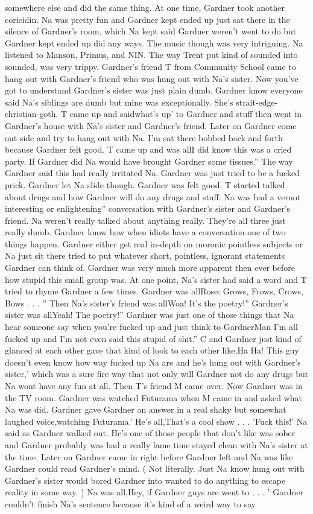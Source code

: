 \documentclass[12pt]{book}
\begin{document}
somewhere else and did the same thing. At one time, Gardner took another coricidin. Na was pretty fun and Gardner kept ended up just sat there in the silence of Gardner's room, which Na kept said Gardner weren't went to do but Gardner kept ended up did any ways. The music though was very intriguing. Na listened to Manson, Primus, and NIN. The way Trent put kind of sounded into sounded, was very trippy. Gardner's friend T from Community School came to hang out with Gardner's friend who was hung out with Na's sister. Now you've got to understand Gardner's sister was just plain dumb. Gardner know everyone said Na's siblings are dumb but mine was exceptionally. She's strait-edge-christian-goth. T came up and saidwhat's up' to Gardner and stuff then went in Gardner's house with Na's sister and Gardner's friend. Later on Gardner come out side and try to hang out with Na. I'm sat there bobbed back and forth because Gardner felt good. T came up and was allI did know this was a cried party. If Gardner did Na would have brought Gardner some tissues.'' The way Gardner said this had really irritated Na. Gardner was just tried to be a fucked prick. Gardner let Na slide though. Gardner was felt good. T started talked about drugs and how Gardner will do any drugs and stuff. Na was had a vernot interesting or enlightening'' conversation with Gardner's sister and Gardner's friend. Na weren't really talked about anything really. They're all three just really dumb. Gardner know how when idiots have a conversation one of two things happen. Gardner either get real in-depth on moronic pointless subjects or Na just sit there tried to put whatever short, pointless, ignorant statements Gardner can think of. Gardner was very much more apparent then ever before how stupid this small group was. At one point, Na's sister had said a word and T tried to rhyme Gardner a few times. Gardner was allRose: Grows, Frows, Crows, Bows . . . '' Then Na's sister's friend was allWoa! It's the poetry!'' Gardner's sister was allYeah! The poetry!'' Gardner was just one of those things that Na hear someone say when you're fucked up and just think to GardnerMan I'm all fucked up and I'm not even said this stupid of shit.'' C and Gardner just kind of glanced at each other gave that kind of look to each other like,Ha Ha! This guy doesn't even know how way fucked up Na are and he's hung out with Gardner's sister,' which was a sure fire way that not only will Gardner not do any drugs but Na wont have any fun at all. Then T's friend M came over. Now Gardner was in the TV room. Gardner was watched Futurama when M came in and asked what Na was did. Gardner gave Gardner an answer in a real shaky but somewhat laughed voice,watching Futurama.' He's all,That's a cool show . . .  'Fuck this!' Na said as Gardner walked out. He's one of those people that don't like was sober and Gardner probably was had a really lame time stayed clean with Na's sister at the time. Later on Gardner came in right before Gardner left and Na was like Gardner could read Gardner's mind. ( Not literally. Just Na know hung out with Gardner's sister would bored Gardner into wanted to do anything to escape reality in some way. ) Na was all,Hey, if Gardner guys are went to . . .  ' Gardner couldn't finish Na's sentence because it's kind of a weird way to say 
\end{document}
